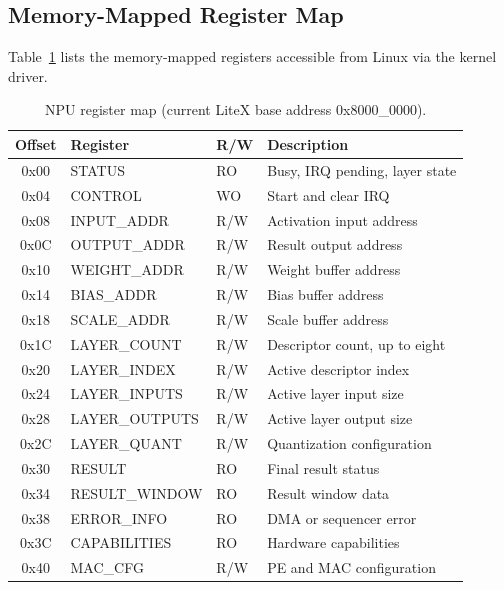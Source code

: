 \documentclass[10pt,conference]{IEEEtran}
\begin{document}
\subsection{Memory-Mapped Register Map}
\label{sec:regmap}


Table~\ref{tab:regmap} lists the memory-mapped registers accessible from Linux via the kernel driver.

\begin{table}[htbp]
\centering
\caption{NPU register map (current LiteX base address 0x8000\_0000).}
\label{tab:regmap}
\small
\begin{tabular}{clll}
\toprule
\textbf{Offset} & \textbf{Register} & \textbf{R/W} & \textbf{Description} \\
\midrule
0x00 & STATUS & RO & Busy, IRQ pending, layer state \\
0x04 & CONTROL & WO & Start and clear IRQ \\
0x08 & INPUT\_ADDR & R/W & Activation input address \\
0x0C & OUTPUT\_ADDR & R/W & Result output address \\
0x10 & WEIGHT\_ADDR & R/W & Weight buffer address \\
0x14 & BIAS\_ADDR & R/W & Bias buffer address \\
0x18 & SCALE\_ADDR & R/W & Scale buffer address \\
0x1C & LAYER\_COUNT & R/W & Descriptor count, up to eight \\
0x20 & LAYER\_INDEX & R/W & Active descriptor index \\
0x24 & LAYER\_INPUTS & R/W & Active layer input size \\
0x28 & LAYER\_OUTPUTS & R/W & Active layer output size \\
0x2C & LAYER\_QUANT & R/W & Quantization configuration \\
0x30 & RESULT & RO & Final result status \\
0x34 & RESULT\_WINDOW & RO & Result window data \\
0x38 & ERROR\_INFO & RO & DMA or sequencer error \\
0x3C & CAPABILITIES & RO & Hardware capabilities \\
0x40 & MAC\_CFG & R/W & PE and MAC configuration \\
\bottomrule
\end{tabular}
\end{table}
\end{document}
